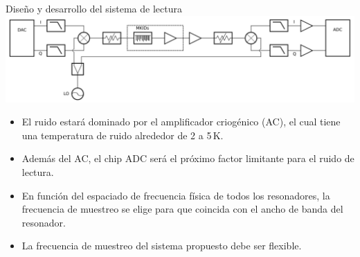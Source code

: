\documentclass[ignorenonframetext,12pt]{beamer}
\begin{document}
\begin{frame}{Diseño y desarrollo del sistema de lectura}
				\centering
				\includegraphics[width=\textwidth]{readout1}

				\begin{itemize}
								\item El ruido estará \alert{dominado por el amplificador
												criogénico (AC)},	el cual tiene una temperatura de ruido
												alrededor de 2 a 5\,K. 
								\item Además del AC, \alert{el chip ADC será el próximo factor
												limitante para el ruido de lectura}.
								\item	En función del espaciado de frecuencia física de todos los
												resonadores, \alert{la frecuencia de muestreo se elige para que
												coincida con el ancho de banda del resonador}.
								\item	La frecuencia de muestreo del sistema propuesto debe ser
												{\color[rgb]{0.2,0.9,0.3}flexible}.  
				\end{itemize}

\end{frame}
\end{document}
